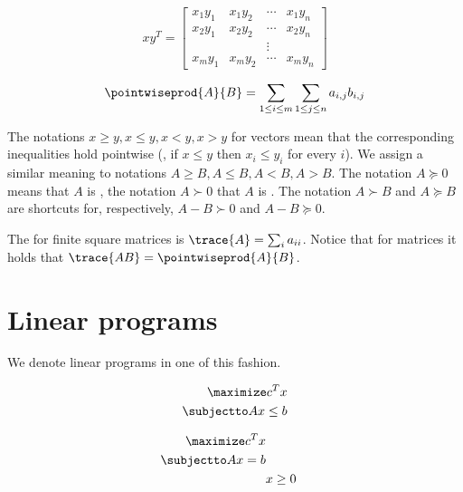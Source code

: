 \documentclass[a4paper,justified]{tufte-handout}
\begin{document}
\begin{figure*}
\begin{minipage}[b]{0.45\textwidth}
\begin{equation*}
  xy^{T}=\begin{bmatrix}
  x_{1}y_{1} & x_{1}y_{2} & \cdots & x_{1}y_{n} \\
  x_{2}y_{1} & x_{2}y_{2} & \cdots & x_{2}y_{n} \\
  & & \vdots & \\
  x_{m}y_{1} & x_{m}y_{2} & \cdots & x_{m}y_{n}
\end{bmatrix}
\end{equation*}
\end{minipage}
\begin{minipage}[b]{0.45\textwidth}
  \begin{equation*}
    \pointwiseprod{A}{B}=\sum_{1\leq i \leq m}\sum_{1\leq j \leq n} a_{i,j}b_{i,j}
  \end{equation*} 
\end{minipage}
\end{figure*}

The notations $ x \geq y, x \leq y, x < y, x > y$ for vectors mean
that the corresponding inequalities hold pointwise (\ie, if $ x \leq y
$ then $ x_{i} \leq y_{i} $ for every $ i $). We assign a similar
meaning to notations $ A \geq B, A \leq B, A < B, A > B$.
%
The notation $ A \succeq 0 $ means that $ A $ is
, the notation $ A \succ 0 $ that
$ A $ is . The notation $ A \succ B $
and $ A \succeq B$ are shortcuts for, respectively,  $ A - B \succ 0$
and $  A - B \succeq 0$.

The  for finite square matrices is $
\trace{A} = \sum_{i}a_{ii} $. Notice that for 
matrices it holds that $ \trace{AB}=\pointwiseprod{A}{B} $.




\section{Linear programs}

We denote linear programs in one of this fashion.

\begin{figure}
\begin{minipage}[t]{0.5\textwidth}
\begin{alignat*}{2}
  \maximize c^{T}x\\
  \subjectto Ax \leq b
\end{alignat*}
\end{minipage}
\begin{minipage}[t]{0.5\textwidth}
\begin{alignat*}{2}
  \maximize c^{T}x \\
  \subjectto Ax = b\\
  & x \geq 0
\end{alignat*}
\end{minipage}
\end{figure}
\end{document}
